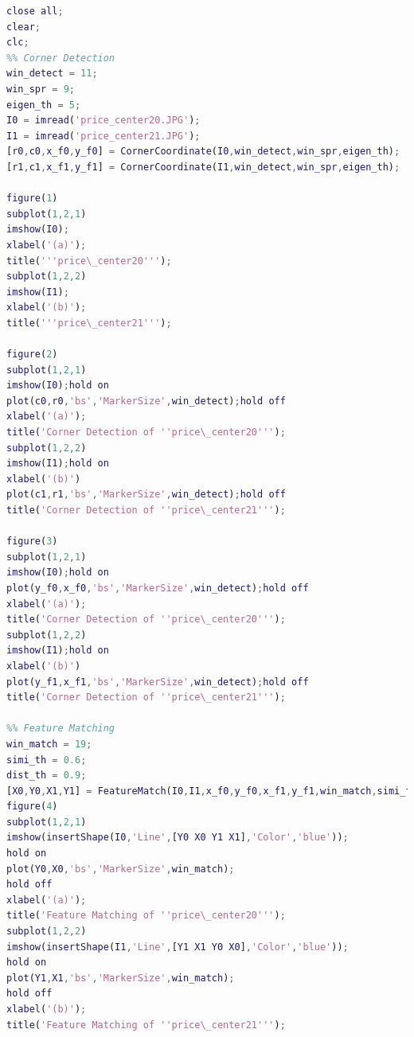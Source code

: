 \documentclass{assignment}
\begin{document}
\begin{lstlisting}[language=MATLAB]
close all;
clear;
clc;
%% Corner Detection
win_detect = 11;
win_spr = 9;
eigen_th = 5;
I0 = imread('price_center20.JPG');
I1 = imread('price_center21.JPG');
[r0,c0,x_f0,y_f0] = CornerCoordinate(I0,win_detect,win_spr,eigen_th);
[r1,c1,x_f1,y_f1] = CornerCoordinate(I1,win_detect,win_spr,eigen_th);

figure(1)
subplot(1,2,1)
imshow(I0);
xlabel('(a)');
title('''price\_center20''');
subplot(1,2,2)
imshow(I1);
xlabel('(b)');
title('''price\_center21''');

figure(2)
subplot(1,2,1)
imshow(I0);hold on
plot(c0,r0,'bs','MarkerSize',win_detect);hold off
xlabel('(a)');
title('Corner Detection of ''price\_center20''');
subplot(1,2,2)
imshow(I1);hold on
xlabel('(b)')
plot(c1,r1,'bs','MarkerSize',win_detect);hold off
title('Corner Detection of ''price\_center21''');

figure(3)
subplot(1,2,1)
imshow(I0);hold on
plot(y_f0,x_f0,'bs','MarkerSize',win_detect);hold off
xlabel('(a)');
title('Corner Detection of ''price\_center20''');
subplot(1,2,2)
imshow(I1);hold on
xlabel('(b)')
plot(y_f1,x_f1,'bs','MarkerSize',win_detect);hold off
title('Corner Detection of ''price\_center21''');

%% Feature Matching
win_match = 19;
simi_th = 0.6;
dist_th = 0.9;
[X0,Y0,X1,Y1] = FeatureMatch(I0,I1,x_f0,y_f0,x_f1,y_f1,win_match,simi_th,dist_th);
figure(4)
subplot(1,2,1)
imshow(insertShape(I0,'Line',[Y0 X0 Y1 X1],'Color','blue'));
hold on
plot(Y0,X0,'bs','MarkerSize',win_match);
hold off
xlabel('(a)');
title('Feature Matching of ''price\_center20''');
subplot(1,2,2)
imshow(insertShape(I1,'Line',[Y1 X1 Y0 X0],'Color','blue'));
hold on
plot(Y1,X1,'bs','MarkerSize',win_match);
hold off
xlabel('(b)');
title('Feature Matching of ''price\_center21''');
\end{lstlisting}
\end{document}
